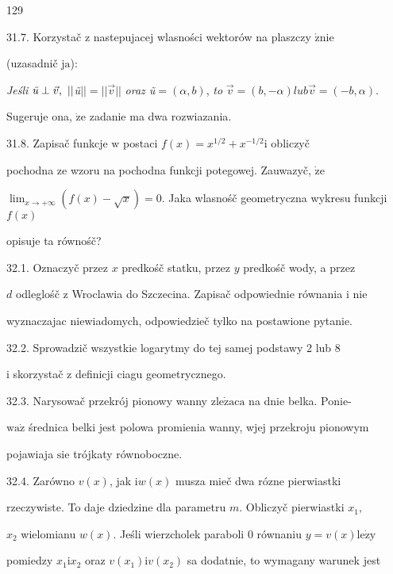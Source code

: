 \documentclass[a4paper,12pt]{article}
\begin{document}
129

31.7. Korzystač $\mathrm{z}$ nastepujacej wlasności wektorów na plaszczy $\acute{\mathrm{z}}\mathrm{n}\mathrm{i}\mathrm{e}$

(uzasadnič $\mathrm{j}\mathrm{a}$):

{\it Jeśli} $\text{{\it ũ}}\perp\vec{v},\ ||${\it ũ}$|| =||\vec{v}||$ {\it oraz ũ}$= (\alpha,b)$, {\it to} $\vec{v}=(b,-\alpha) lub\vec{v}=(-b,\alpha).$

Sugeruje ona, $\dot{\mathrm{z}}\mathrm{e}$ zadanie ma dwa rozwiazania.

31.8. Zapisač funkcje $\mathrm{w}$ postaci $f(x) = x^{1/2} +x^{-1/2} \mathrm{i}$ obliczyč

pochodna ze wzoru na pochodna funkcji potegowej. Zauwazyč, $\dot{\mathrm{z}}\mathrm{e}$

$\displaystyle \lim_{x\rightarrow+\infty}(f(x)-\sqrt{x})=0$. Jaka wlasnośč geometryczna wykresu funkcji $f(x)$

opisuje ta równośč?

32.1. Oznaczyč przez $x$ predkośč statku, przez $y$ predkośč wody, a przez

$d$ odleglośč $\mathrm{z}$ Wroclawia do Szczecina. Zapisač odpowiednie równania $\mathrm{i}$ nie

wyznaczajac niewiadomych, odpowiedzieč tylko na postawione pytanie.

32.2. Sprowadzič wszystkie logarytmy do tej samej podstawy 2 lub 8

$\mathrm{i}$ skorzystač $\mathrm{z}$ definicji ciagu geometrycznego.

32.3. Narysowač przekrój pionowy wanny $\mathrm{z}\mathrm{l}\mathrm{e}\dot{\mathrm{z}}\mathrm{a}\mathrm{c}\mathrm{a}$ na dnie belka. Ponie-

$\mathrm{w}\mathrm{a}\dot{\mathrm{z}}$ średnica belki jest polowa promienia wanny, wjej przekroju pionowym

pojawiaja $\mathrm{s}\mathrm{i}\mathrm{e}$ trójkaty równoboczne.

32.4. Zarówno $v(x)$, jak $\mathrm{i} w(x)$ musza mieč dwa rózne pierwiastki

rzeczywiste. To daje dziedzine dla parametru $m$. Obliczyč pierwiastki $x_{1},$

$x_{2}$ wielomianu $w(x)$. Jeśli wierzcholek paraboli $0$ równaniu $y=v(x) \mathrm{l}\mathrm{e}\dot{\mathrm{z}}\mathrm{y}$

pomiedzy $x_{1}\mathrm{i}x_{2}$ oraz $v(x_{1})\mathrm{i}v(x_{2})$ sa dodatnie, to wymagany warunek jest
\end{document}
